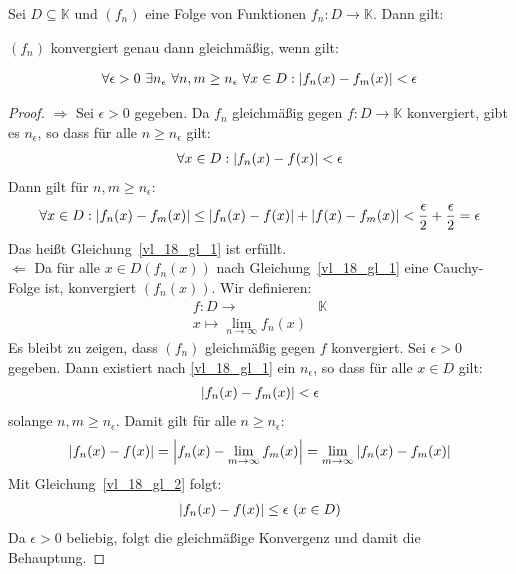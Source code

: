 \begin{Satz}{\label{vl_18_satz_1}%
	Sei $D \subseteq \mathbb{K}$ und $(f_n)$ eine Folge von Funktionen $f_n: D 
	\rightarrow \mathbb{K}$. Dann gilt: 
	\begin{center}
		$(f_n)$ konvergiert genau dann gleichmäßig, wenn gilt:
	\end{center}
	\begin{align}\label{vl_18_gl_1}
		\forall \epsilon > 0 \text{ } \exists n_{\epsilon} \text{ }\forall n,m \geq 	
		n_{\epsilon} \text{ }\forall x \in D : \abs{f_n(x) - f_m(x)} < \epsilon
	\end{align}
}\end{Satz}

\begin{proof}
	$\Rightarrow$ Sei $\epsilon > 0$ gegeben. Da $f_n$ gleichmäßig gegen $f: D 
	\rightarrow \mathbb{K}$ konvergiert, gibt es $n_{\epsilon}$, so dass für alle 
	$n \geq n_{\epsilon}$ gilt:
	\begin{align*}
		\forall x \in D: \abs{ f_n(x) -f(x)} < \epsilon
	\end{align*}
	Dann gilt für $n,m \geq n_{\epsilon}$:
	\begin{align*}
		\forall x \in D: \abs{f_n(x) - f_m(x)} \leq \abs{f_n(x) -f(x)} + 
		\abs{f(x) -f_m(x)} < \frac{\epsilon}{2} + \frac{\epsilon}{2} = \epsilon
	\end{align*}
	Das heißt Gleichung~\ref{vl_18_gl_1} ist erfüllt. \\
	$\Leftarrow$ Da für alle $x \in D (f_n(x))$ nach Gleichung~\ref{vl_18_gl_1} 
	eine Cauchy-Folge ist, konvergiert $(f_n(x))$.
	Wir definieren: 
	\begin{align*}
		f: D \rightarrow & \mathbb{K} \\
		x \mapsto \lim\limits_{n \rightarrow \infty} f_n(x)
	\end{align*}		
	Es bleibt zu zeigen, dass $(f_n)$ gleichmäßig gegen $f$ konvergiert. 
	Sei $\epsilon > 0$ gegeben. Dann existiert nach \ref{vl_18_gl_1} ein 
	$n_{\epsilon}$, so dass für alle $x \in D$ gilt:
	\begin{align}\label{vl_18_gl_2}
		\abs{f_n(x) - f_m(x)} < \epsilon
	\end{align}
	solange $n,m \geq n_{\epsilon}$. Damit gilt für alle $n \geq n_{\epsilon}$:
	\begin{align*}
		\abs{f_n(x) - f(x)} = \abs{f_n(x) - \lim\limits_{m \rightarrow \infty} 
		{f_m(x)}} = \lim\limits_{m \rightarrow \infty} \abs{f_n(x) - f_m(x)}
	\end{align*}
	Mit Gleichung~\ref{vl_18_gl_2} folgt:
	\begin{align*}
		\abs{f_n(x) -f(x)} \leq \epsilon \text{ } (x \in D)
\end{align*}		
	Da $\epsilon > 0$ beliebig, folgt die gleichmäßige Konvergenz und 
	damit die Behauptung.
\end{proof}

